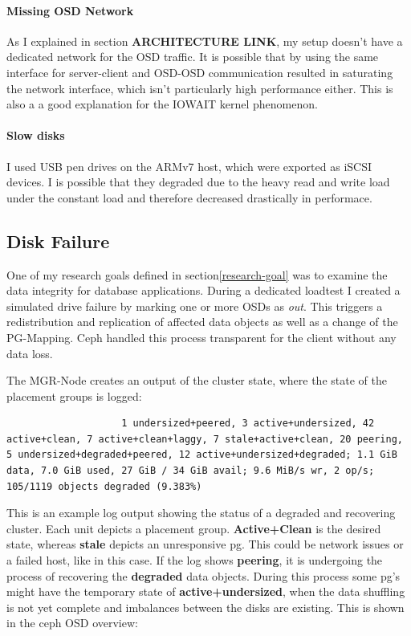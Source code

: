 \documentclass[titlepage, a4paper, 11pt]{scrartcl}
\begin{document}
                \paragraph{Missing OSD Network} As I explained in section \textbf{ARCHITECTURE LINK}, my setup doesn't have a dedicated network for the OSD traffic. It is possible that by using the same interface for server-client and OSD-OSD communication resulted in saturating the network interface, which isn't particularly high performance either. This is also a a good explanation for the IOWAIT kernel phenomenon.

                \paragraph{Slow disks} I used USB pen drives on the ARMv7 host, which were exported as iSCSI devices. I is possible that they degraded due to the heavy read and write load under the constant load and therefore decreased drastically in performace.

            \subsection{Disk Failure}

                One of my research goals defined in section\ref*{research-goal} was to examine the data integrity for database applications. During a dedicated loadtest I created a simulated drive failure by marking one or more OSDs as \textit{out}. This triggers a redistribution and replication of affected data objects as well as a change of the PG-Mapping. Ceph handled this process transparent for the client without any data loss.

                The MGR-Node creates an output of the cluster state, where the state of the placement groups is logged:

                \begin{lstlisting}
                    1 undersized+peered, 3 active+undersized, 42 active+clean, 7 active+clean+laggy, 7 stale+active+clean, 20 peering, 5 undersized+degraded+peered, 12 active+undersized+degraded; 1.1 GiB data, 7.0 GiB used, 27 GiB / 34 GiB avail; 9.6 MiB/s wr, 2 op/s; 105/1119 objects degraded (9.383%)
                \end{lstlisting}

                This is an example log output showing the status of a degraded and recovering cluster.
                Each unit depicts a placement group. \textbf{Active+Clean} is the desired state, whereas \textbf{stale} depicts an unresponsive pg. This could be network issues or a failed host, like in this case. If the log shows \textbf{peering}, it is undergoing the process of recovering the \textbf{degraded} data objects. During this process some pg's might have the temporary state of \textbf{active+undersized}, when the data shuffling is not yet complete and imbalances between the disks are existing. This is shown in the ceph OSD overview:
\end{document}

